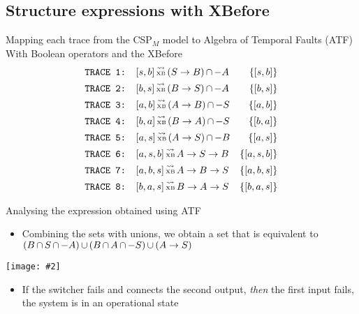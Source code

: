 \documentclass{beamer}
\def\ATF{%
	Algebra of Temporal Faults (ATF)%
	\gdef\ATF{ATF\xspace}%
	\gdef\iATF{an ATF\xspace}%
	\gdef\IATF{An ATF\xspace}%
	\xspace%
}
\def\iATF{%
	an Algebra of Temporal Faults (ATF)%
	\gdef\ATF{ATF\xspace}%
	\gdef\iATF{an ATF\xspace}%
	\gdef\IATF{An ATF\xspace}%
	\xspace%
}
\def\IATF{%
	An Algebra of Temporal Faults (ATF)%
	\gdef\ATF{ATF\xspace}%
	\gdef\iATF{an ATF\xspace}%
	\gdef\IATF{An ATF\xspace}%
	\xspace%
}
\newcommand{\includegraphicsaspectratio}[2][1]{%
  \texttt{[image: \#2]}%
}
\def\xbeforeop{\ensuremath\rightarrow}
\newcommand{\xbefore}[2]{\ensuremath #1 \xbeforeop #2 }
\def\union{\ensuremath\operatorname{\cup}}
\def\inter{\ensuremath\operatorname{\cap}}
\def\CSPm{CSP$_M$\xspace}
\def\tracetoalgebra{\ensuremath\operatorname{\stackrel{\leadsto}{\text{\tiny XB}}}}
\begin{document}
\subsection{Structure expressions with XBefore}
\begin{frame}[fragile]{Mapping each trace from the \CSPm model to \ATF}{With Boolean operators and the XBefore}
{\scriptsize
	\begin{align*}
		\text{\texttt{TRACE 1: }}&[s,b] \tracetoalgebra \left(\xbefore{S}{B}\right) \inter -A & \left\{[s,b]\right\}\\
		\text{\texttt{TRACE 2: }}&[b,s] \tracetoalgebra \left(\xbefore{B}{S}\right) \inter -A & \left\{[b,s]\right\}\\
		\text{\texttt{TRACE 3: }}&[a,b] \tracetoalgebra \left(\xbefore{A}{B}\right) \inter -S & \left\{[a,b]\right\}\\
		\text{\texttt{TRACE 4: }}&[b,a] \tracetoalgebra \left(\xbefore{B}{A}\right) \inter -S & \left\{[b,a]\right\}\\
		\text{\texttt{TRACE 5: }}&[a,s] \tracetoalgebra \left(\xbefore{A}{S}\right) \inter -B & \left\{[a,s]\right\}\\
		\text{\texttt{TRACE 6: }}&[a,s,b] \tracetoalgebra \xbefore{\xbefore{A}{S}}{B} & \left\{[a,s,b]\right\}\\
		\text{\texttt{TRACE 7: }}&[a,b,s] \tracetoalgebra \xbefore{\xbefore{A}{B}}{S} & \left\{[a,b,s]\right\}\\
		\text{\texttt{TRACE 8: }}&[b,a,s] \tracetoalgebra \xbefore{\xbefore{B}{A}}{S} & \left\{[b,a,s]\right\}
	\end{align*}}
\end{frame}

\begin{frame}{Analysing the expression obtained using \ATF}
	\begin{itemize}
		\item Combining the sets with unions, we obtain a set that is equivalent to 
$\left(B \inter S \inter -A\right) \union \left(B \inter A \inter -S\right) \union \left(\xbefore{A}{S}\right)$
	\end{itemize}
	\begin{center}
		\includegraphicsaspectratio[0.60]{blockDiagramMonitorInternals}
	\end{center}
	\begin{itemize}
		\item If the switcher fails and connects the second output, \emph{then} the first input fails, the system is in an operational state
	\end{itemize}
\end{frame}
\end{document}
